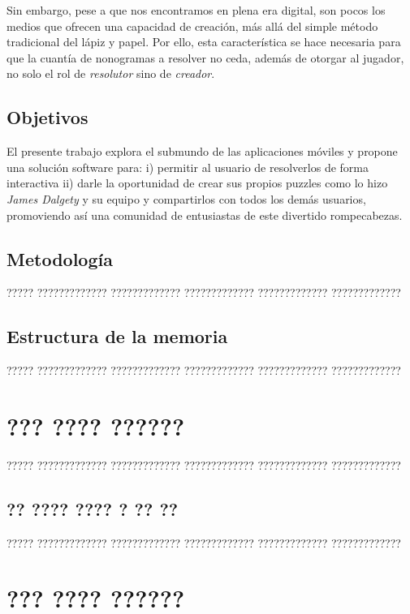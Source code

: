 \documentclass[11pt,spanish,listoffigures,listoftables]{tfgetsinf}
\begin{document}
Sin embargo, pese a que nos encontramos en plena era digital, son pocos los medios que ofrecen una capacidad de creación,
más allá del simple método tradicional del lápiz y papel.
Por ello, esta característica se hace necesaria para que la cuantía de nonogramas a resolver no ceda, además de otorgar al jugador, no 
solo el rol de \textit{resolutor} sino de \textit{creador}.


\section{Objetivos}

El presente trabajo explora el submundo de las aplicaciones móviles y propone una solución software para: i) permitir 
al usuario de resolverlos de forma interactiva ii) darle la oportunidad de crear sus propios puzzles como lo hizo
\textit{James Dalgety} y su equipo y compartirlos con todos los demás usuarios, promoviendo así una comunidad de entusiastas de este
divertido rompecabezas.

\section{Metodología}

????? ????????????? ????????????? ????????????? ????????????? ????????????? 

\section{Estructura de la memoria} %

????? ????????????? ????????????? ????????????? ????????????? ?????????????


\chapter{??? ???? ??????}

????? ????????????? ????????????? ????????????? ????????????? ?????????????

\section{?? ???? ???? ? ?? ??}

????? ????????????? ????????????? ????????????? ????????????? ?????????????

\chapter{??? ???? ??????}
\end{document}
